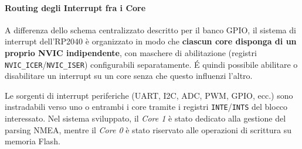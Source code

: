 \paragraph{Routing degli Interrupt fra i Core}

A differenza dello schema centralizzato descritto per il banco GPIO, il sistema di interrupt dell'RP2040 è organizzato in modo che \textbf{ciascun core disponga di un proprio NVIC indipendente}, con maschere di abilitazione (registri \texttt{NVIC\_ICER}/\texttt{NVIC\_ISER}) configurabili separatamente. É quindi possibile abilitare o disabilitare un interrupt su un core senza che questo influenzi l'altro.

Le sorgenti di interrupt periferiche (UART, I2C, ADC, PWM, GPIO, ecc.) sono instradabili verso uno o entrambi i core tramite i registri \texttt{INTE}/\texttt{INTS} del blocco interessato.
Nel sistema sviluppato, il \textit{Core 1} è stato dedicato alla gestione del parsing NMEA, mentre il \textit{Core 0} è stato riservato alle operazioni di scrittura su memoria Flash.